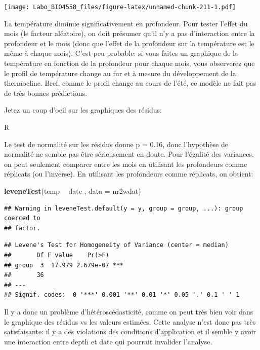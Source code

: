 \documentclass[12pt,]{book}
\newenvironment{Shaded}{\begin{snugshade}}{\end{snugshade}}
\newcommand{\DataTypeTok}[1]{\textcolor[rgb]{0.27,0.27,0.27}{#1}}
\newcommand{\KeywordTok}[1]{\textcolor[rgb]{0.27,0.27,0.27}{\textbf{#1}}}
\newcommand{\NormalTok}[1]{#1}
\newcommand{\OperatorTok}[1]{\textcolor[rgb]{0.43,0.43,0.43}{\textbf{#1}}}
\newcommand{\StringTok}[1]{\textcolor[rgb]{0.5,0.5,0.5}{#1}}
\begin{document}
\texttt{[image: Labo\_BIO4558\_files/figure-latex/unnamed-chunk-211-1.pdf]}

La température diminue significativement en profondeur. Pour tester l'effet du mois (le facteur aléatoire), on doit présumer qu'il n'y a pas d'interaction entre la profondeur et le mois (donc que l'effet de la profondeur sur la température est le même à chaque mois). C'est peu probable: si vous faites un graphique de la température en fonction de la profondeur pour chaque mois, vous observerez que le profil de température change au fur et à mesure du développement de la thermocline. Bref, comme le profil change au cours de l'été, ce modèle ne fait pas de très bonnes prédictions.

Jetez un coup d'oeil sur les graphiques des résidus:

R

Le test de normalité sur les résidus donne p = 0.16, donc l'hypothèse de normalité ne semble pas être sérieusement en doute. Pour l'égalité des variances, on peut seulement comparer entre les mois en utilisant les profondeurs comme réplicats (ou l'inverse). En utilisant les profondeurs comme réplicats, on obtient:

\begin{Shaded}
\begin{Highlighting}[]
\KeywordTok{leveneTest}\NormalTok{(temp }\OperatorTok{~}\StringTok{ }\NormalTok{date , }\DataTypeTok{data =}\NormalTok{ nr2wdat)}
\end{Highlighting}
\end{Shaded}

\begin{verbatim}
## Warning in leveneTest.default(y = y, group = group, ...): group coerced to
## factor.
\end{verbatim}

\begin{verbatim}
## Levene's Test for Homogeneity of Variance (center = median)
##       Df F value    Pr(>F)    
## group  3  17.979 2.679e-07 ***
##       36                      
## ---
## Signif. codes:  0 '***' 0.001 '**' 0.01 '*' 0.05 '.' 0.1 ' ' 1
\end{verbatim}

Il y a donc un problème d'hétéroscédasticité, comme on peut très bien voir dans le graphique des résidus vs les valeurs estimées. Cette analyse n'est donc pas très satisfaisante: il y a des violations des conditions d'application et il semble y avoir une interaction entre depth et date qui pourrait invalider l'analyse.
\end{document}
